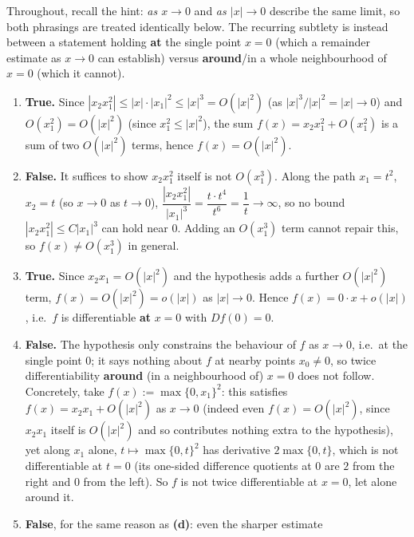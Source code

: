 \begin{exercisesolution}
\label{sol:landau_notation_multiple_choice}
Throughout, recall the hint: \textit{as $x \to 0$} and \textit{as $|x| \to 0$} describe the same
limit, so both phrasings are treated identically below. The recurring subtlety is instead between
a statement holding \textbf{at} the single point $x=0$ (which a remainder estimate as $x \to 0$
can establish) versus \textbf{around}/in a whole neighbourhood of $x=0$ (which it cannot).
\begin{enumerate}[label=\textbf{(\alph*)}]
  \item \textbf{True.} Since $|x_2x_1^2| \leq |x|\cdot|x_1|^2 \leq |x|^3 = O(|x|^2)$ (as
    $|x|^3/|x|^2 = |x| \to 0$) and $O(x_1^2) = O(|x|^2)$ (since $x_1^2 \leq |x|^2$), the sum
    $f(x) = x_2x_1^2 + O(x_1^2)$ is a sum of two $O(|x|^2)$ terms, hence $f(x) = O(|x|^2)$.
  \item \textbf{False.} It suffices to show $x_2x_1^2$ itself is not $O(x_1^3)$. Along the path
    $x_1 = t^2$, $x_2 = t$ (so $x \to 0$ as $t \to 0$), $\dfrac{|x_2x_1^2|}{|x_1|^3} =
    \dfrac{t\cdot t^4}{t^6} = \dfrac{1}{t} \to \infty$, so no bound $|x_2x_1^2| \leq C|x_1|^3$ can
    hold near $0$. Adding an $O(x_1^3)$ term cannot repair this, so $f(x) \neq O(x_1^3)$ in
    general.
  \item \textbf{True.} Since $x_2x_1 = O(|x|^2)$ and the hypothesis adds a further $O(|x|^2)$
    term, $f(x) = O(|x|^2) = o(|x|)$ as $|x| \to 0$. Hence $f(x) = 0\cdot x + o(|x|)$, i.e.\ $f$ is
    differentiable \textbf{at} $x=0$ with $Df(0) = 0$.
  \item \textbf{False.} The hypothesis only constrains the behaviour of $f$ as $x \to 0$, i.e.\ at
    the single point $0$; it says nothing about $f$ at nearby points $x_0 \neq 0$, so twice
    differentiability \textbf{around} (in a neighbourhood of) $x=0$ does not follow. Concretely,
    take $f(x) := \max\{0,x_1\}^2$: this satisfies $f(x) = x_2x_1 + O(|x|^2)$ as $x \to 0$ (indeed
    even $f(x) = O(|x|^2)$, since $x_2x_1$ itself is $O(|x|^2)$ and so contributes nothing extra
    to the hypothesis), yet along $x_1$ alone, $t \mapsto \max\{0,t\}^2$ has derivative $2\max\{0,t\}$,
    which is not differentiable at $t=0$ (its one-sided difference quotients at $0$ are $2$ from
    the right and $0$ from the left). So $f$ is not twice differentiable at $x=0$, let alone
    around it.
  \item \textbf{False}, for the same reason as \textbf{(d)}: even the sharper estimate

\end{enumerate}
\end{exercisesolution}

